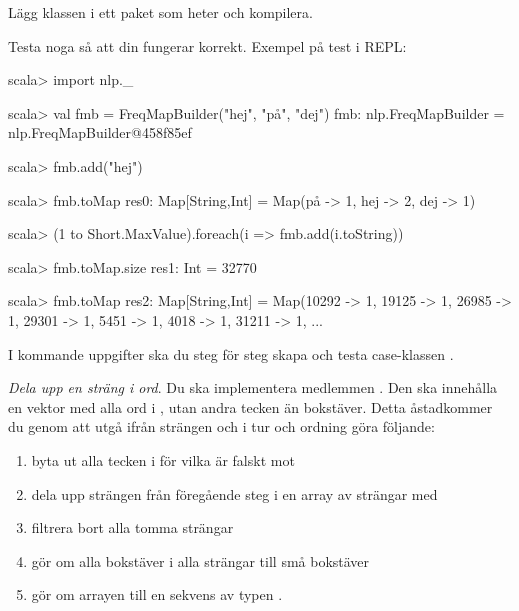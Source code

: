 \Subtask Lägg klassen  i ett paket som heter  och kompilera.

\begin{figure}[H]
\end{figure}

\Subtask Testa noga så att din  fungerar korrekt. Exempel på test i REPL:
\begin{REPL}
scala> import nlp._

scala> val fmb = FreqMapBuilder("hej", "på", "dej")
fmb: nlp.FreqMapBuilder = nlp.FreqMapBuilder@458f85ef

scala> fmb.add("hej")

scala> fmb.toMap
res0: Map[String,Int] = Map(på -> 1, hej -> 2, dej -> 1)

scala> (1 to Short.MaxValue).foreach(i => fmb.add(i.toString))

scala> fmb.toMap.size
res1: Int = 32770

scala> fmb.toMap
res2: Map[String,Int] = 
  Map(10292 -> 1, 19125 -> 1, 26985 -> 1, 29301 -> 1, 5451 -> 1, 4018 -> 1, 31211 -> 1, ...
\end{REPL}

\noindent I kommande uppgifter ska du steg för steg skapa och testa case-klassen . %

\begin{figure}[H]
\end{figure}





\Task \emph{Dela upp en sträng i ord}. Du ska implementera medlemmen . Den ska innehålla en vektor med alla ord i , utan andra tecken än bokstäver.
Detta åstadkommer du genom att utgå ifrån strängen  och i tur och ordning göra följande:
\begin{enumerate}%
\item byta ut alla tecken i  för vilka  är falskt mot 
\item dela upp strängen från föregående steg i en array av strängar med 
\item filtrera bort alla tomma strängar
\item gör om alla bokstäver i alla strängar till små bokstäver
\item gör om arrayen till en sekvens av typen .
\end{enumerate}

